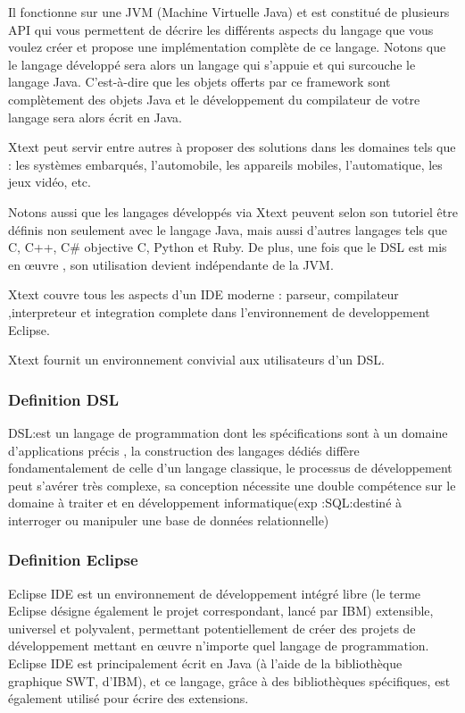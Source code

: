 \documentclass{article}
\begin{document}
{Il fonctionne sur une JVM (Machine Virtuelle Java) et est constitué de plusieurs API qui vous permettent de décrire les différents aspects du langage que vous voulez créer et propose une implémentation complète de ce langage. Notons que le langage développé sera alors un langage qui s'appuie et qui surcouche le langage Java. C'est-à-dire que les objets offerts par ce framework sont complètement des objets Java et le développement du compilateur de votre langage sera alors écrit en Java.

Xtext peut servir entre autres à proposer des solutions dans les domaines tels que : les systèmes embarqués, l'automobile, les appareils mobiles, l'automatique, les jeux vidéo, etc.

Notons aussi que les langages développés via Xtext peuvent selon son tutoriel être définis non seulement avec le langage Java, mais aussi d'autres langages tels que C, C++, C# objective C, Python et Ruby. De plus, une fois que le DSL est mis en œuvre , son utilisation devient indépendante de la JVM. 

Xtext couvre tous les aspects d’un IDE moderne : parseur, compilateur ,interpreteur et integration complete dans l’environnement de developpement Eclipse.

Xtext fournit un environnement convivial aux utilisateurs d’un DSL.

\subsubsection{Definition DSL}
DSL:est un langage de programmation dont les spécifications sont à un domaine d’applications précis , la construction des langages dédiés diffère fondamentalement de celle d’un langage classique, le processus de développement  peut s'avérer très complexe, sa conception nécessite une double compétence sur le domaine à traiter et en développement informatique(exp :SQL:destiné à interroger ou manipuler une base de données relationnelle)

\subsubsection{Definition Eclipse}
Eclipse IDE est un environnement de développement intégré libre (le terme Eclipse désigne également le projet correspondant, lancé par IBM) extensible, universel et polyvalent, permettant potentiellement de créer des projets de développement mettant en œuvre n'importe quel langage de programmation. Eclipse IDE est principalement écrit en Java (à l'aide de la bibliothèque graphique SWT, d'IBM), et ce langage, grâce à des bibliothèques spécifiques, est également utilisé pour écrire des extensions.

}
\end{document}
